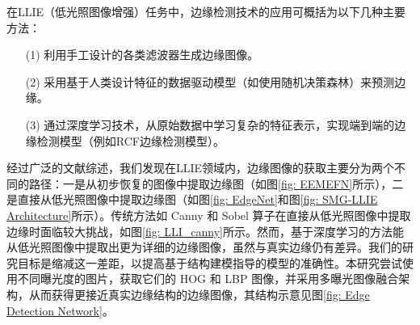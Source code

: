 \documentclass[a4paper]{ctexart}
\begin{document}
	在LLIE（低光照图像增强）任务中，边缘检测技术的应用可概括为以下几种主要方法：
	
	\begin{itemize}
		\item [(1)] 利用手工设计的各类滤波器生成边缘图像。
		
		\item [(2)] 采用基于人类设计特征的数据驱动模型（如使用随机决策森林）来预测边缘。
		
		\item [(3)] 通过深度学习技术，从原始数据中学习复杂的特征表示，实现端到端的边缘检测模型（例如RCF边缘检测模型\cite{liu2017richer}）。
	\end{itemize}

	经过广泛的文献综述，我们发现在LLIE领域内，边缘图像的获取主要分为两个不同的路径：一是从初步恢复的图像中提取边缘图（如图\ref{fig: EEMEFN}所示），二是直接从低光照图像中提取边缘图（如图\ref{fig: EdgeNet}和图\ref{fig: SMG-LLIE Architecture}所示）。传统方法如 Canny 和 Sobel 算子\cite{maini2009study}在直接从低光照图像中提取边缘时面临较大挑战，如图\ref{fig: LLI_canny}所示。然而，基于深度学习的方法能从低光照图像中提取出更为详细的边缘图像，虽然与真实边缘仍有差异。我们的研究目标是缩减这一差距，以提高基于结构建模指导的模型的准确性。本研究尝试使用不同曝光度的图片，获取它们的 HOG 和 LBP 图像，并采用多曝光图像融合架构，从而获得更接近真实边缘结构的边缘图像，其结构示意见图\ref{fig: Edge Detection Network}。
\end{document}
